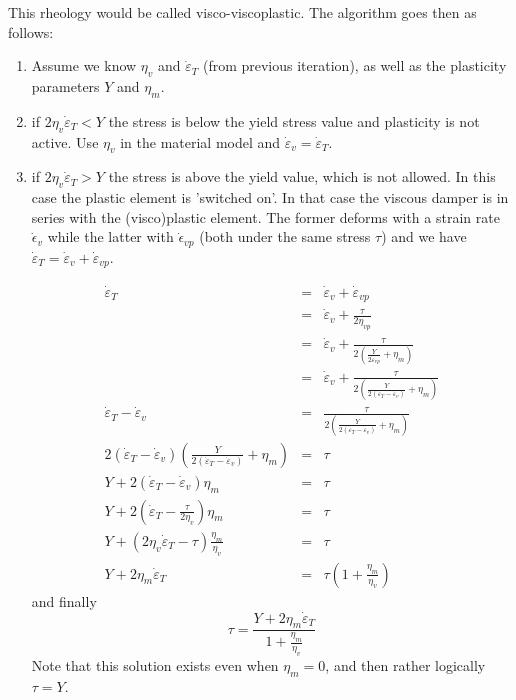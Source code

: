 

\begin{center}

\end{center}
This rheology would be called visco-viscoplastic.
The algorithm goes then as follows:
\begin{enumerate}
\item Assume we know $\eta_v$ and $\dot\varepsilon_T$ (from previous iteration), as well as the plasticity parameters $Y$ and $\eta_m$.
\item if $2 \eta_v \dot\varepsilon_T < Y$ the stress is below the yield stress value and plasticity is not active. Use $\eta_v$ in the material model and $\dot\varepsilon_v=\dot\varepsilon_T$.

\item if $2 \eta_v \dot\varepsilon_T > Y$ the stress is above the yield value, which is not allowed. In this case the plastic element is 'switched on'. In that case the viscous damper is in series with the (visco)plastic element. The former deforms with a strain rate $\dot\epsilon_v$ while the latter with $\dot\epsilon_{vp}$ (both under the same stress $\tau$) and we have  $\dot\varepsilon_T = \dot\varepsilon_v  + \dot\varepsilon_{vp}$. 

\begin{eqnarray}
\dot\varepsilon_T 
&=& \dot\varepsilon_v + \dot\varepsilon_{vp}  \nonumber\\
&=& \dot\varepsilon_v + \frac{\tau}{2 \eta_{vp}} \nonumber\\
&=& \dot\varepsilon_v + \frac{\tau}{2 \left( \frac{Y}{2\dot\varepsilon_{vp}} + \eta_m  \right)} \nonumber\\
&=& \dot\varepsilon_v + \frac{\tau}{2 \left( \frac{Y}{2(\dot\varepsilon_T-\dot\varepsilon_v)}+\eta_m\right)} \nonumber\\
\dot\varepsilon_T - \dot\varepsilon_v 
&=& \frac{\tau}{2 \left( \frac{Y}{2(\dot\varepsilon_T-\dot\varepsilon_v)}+\eta_m\right)} \nonumber\\
2 (\dot\varepsilon_T - \dot\varepsilon_v)
\left( \frac{Y}{2(\dot\varepsilon_T-\dot\varepsilon_v)}+\eta_m\right) &=& \tau \nonumber\\
Y +  2(\dot\varepsilon_T - \dot\varepsilon_v) \eta_m &=& \tau \nonumber\\
Y +  2(\dot\varepsilon_T - \frac{\tau}{2 \eta_v}) \eta_m &=& \tau \nonumber\\
Y +  (2\eta_v \dot\varepsilon_T - \tau) \frac{\eta_m}{\eta_v} &=& \tau \nonumber\\
Y +  2\eta_m \dot\varepsilon_T  &=& \tau (1 + \frac{\eta_m}{\eta_v} ) \nonumber
\end{eqnarray}
and finally 
\begin{equation}
\tau  = \frac{Y + 2 \eta_m \dot\varepsilon_T} {1+ \frac{\eta_m}{\eta_v} }
\end{equation}
Note that this solution exists even when $\eta_m=0$, and then rather logically $\tau=Y$.


\end{enumerate}
